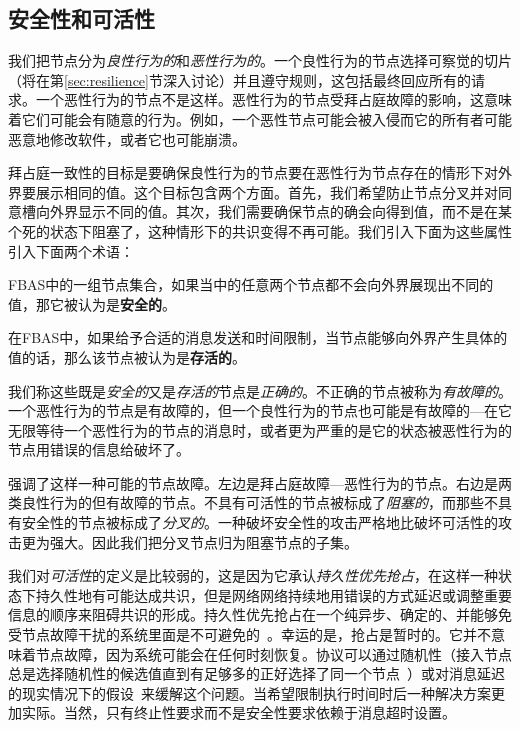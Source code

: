 \subsection{安全性和可活性}

我们把节点分为\textit{良性行为的}和\textit{恶性行为的}。一个良性行为的节点选择可察觉的{\quorum}切片（将在第\ref{sec:resilience}节深入讨论）并且遵守规则，这包括最终回应所有的请求。一个恶性行为的节点不是这样。恶性行为的节点受拜占庭故障的影响，这意味着它们可能会有随意的行为。例如，一个恶性节点可能会被入侵而它的所有者可能恶意地修改软件，或者它也可能崩溃。

拜占庭一致性的目标是要确保良性行为的节点要在恶性行为节点存在的情形下对外界要展示相同的值。这个目标包含两个方面。首先，我们希望防止节点分叉并对同意槽向外界显示不同的值。其次，我们需要确保节点的确会向得到值，而不是在某个死的状态下阻塞了，这种情形下的共识变得不再可能。我们引入下面为这些属性引入下面两个术语：

\begin{definition}[安全性]
	FBAS中的一组节点集合，如果当中的任意两个节点都不会向外界展现出不同的值，那它被认为是{\textbf{安全的}}。
\end{definition}

\begin{definition}[可活性]
	在FBAS中，如果给予合适的消息发送和时间限制，当节点能够向外界产生具体的值的话，那么该节点被认为是{\textbf{存活的}}。
\end{definition}

我们称这些既是\textit{安全的}又是\textit{存活的}节点是\textit{正确的}。不正确的节点被称为{\textit{有故障的}}。一个恶性行为的节点是有故障的，但一个良性行为的节点也可能是有故障的---在它无限等待一个恶性行为的节点的消息时，或者更为严重的是它的状态被恶性行为的节点用错误的信息给破坏了。

强调了这样一种可能的节点故障。左边是拜占庭故障---恶性行为的节点。右边是两类良性行为的但有故障的节点。不具有可活性的节点被标成了\textit{阻塞的}，而那些不具有安全性的节点被标成了\textit{分叉的}。一种破坏安全性的攻击严格地比破坏可活性的攻击更为强大。因此我们把分叉节点归为阻塞节点的子集。

我们对\textit{可活性}的定义是比较弱的，这是因为它承认\textit{持久性优先抢占}，在这样一种状态下持久性地有可能达成共识，但是网络网络持续地用错误的方式延迟或调整重要信息的顺序来阻碍共识的形成。持久性优先抢占在一个纯异步、确定的、并能够免受节点故障干扰的系统里面是不可避免的~\cite{Fischer:1985}。幸运的是，抢占是暂时的。它并不意味着节点故障，因为系统可能会在任何时刻恢复。协议可以通过随机性（接入节点总是选择随机性的候选值直到有足够多的正好选择了同一个节点~\cite{Ben-Or:1983:AFC:800221.806707,Bracha:1985:ACB:4221.214134}）或对消息延迟的现实情况下的假设~\cite{Dwork:1988:CPP:42282.42283}来缓解这个问题。当希望限制执行时间时后一种解决方案更加实际。当然，只有终止性要求而不是安全性要求依赖于消息超时设置。


